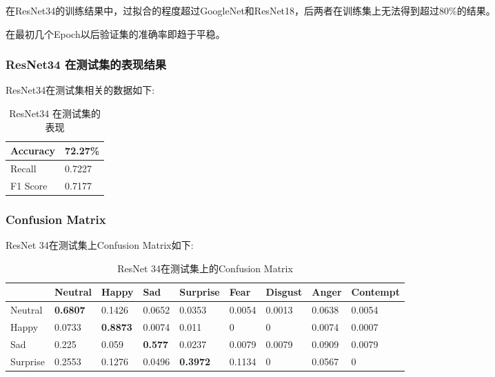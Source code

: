 \documentclass[11pt, a4paper]{article}
\begin{document}
\begin{CJK}{UTF8}{gbsn}
在ResNet34的训练结果中，过拟合的程度超过GoogleNet和ResNet18，后两者在训练集上无法得到超过80\%的结果。

在最初几个Epoch以后验证集的准确率即趋于平稳。

\subsubsection{ResNet34 在测试集的表现结果}

ResNet34在测试集相关的数据如下:

\begin{table}[htbp] 
	\begin{center}
		\caption{ResNet34 在测试集的表现}
		\begin{tabular}{l | l}  \hline
			Accuracy  &  72.27\%  \\ \hline
			Recall        &  0.7227  \\ \hline
			F1 Score    & 0.7177  \\ \hline
		\end{tabular}
		\label{tab:res34_test}
	\end{center}
\end{table}	

\subsubsection{Confusion Matrix}
ResNet 34在测试集上Confusion Matrix如下:

\begin{table}[htbp] 
	\begin{center}
		\caption{ResNet 34在测试集上的Confusion Matrix}
		\begin{tabular}{ | l | l | l | l | l |l | l |l | l | }  \hline
			&  Neutral  & Happy & Sad   &  Surprise   &  Fear  & Disgust  & Anger & Contempt  \\ \hline
			Neutral  & \textbf{0.6807}   & 0.1426  & 0.0652  & 0.0353  & 0.0054 & 0.0013 &  0.0638 & 0.0054 \\ \hline
			
			Happy   & 0.0733  & \textbf{0.8873}  & 0.0074   & 0.011  & 0   & 0  & 0.0074  &  0.0007 \\ \hline
			
			Sad    & 0.225  & 0.059  & \textbf{0.577}   & 0.0237  & 0.0079   & 0.0079  & 0.0909  & 	0.0079  \\ \hline
			
			Surprise    & 0.2553   & 0.1276 & 0.0496   & \textbf{0.3972}   & 0.1134  &  0  & 0.0567 &  0 \\ \hline
			

\end{tabular}
\end{center}
\end{table}
\end{CJK}
\end{document}
